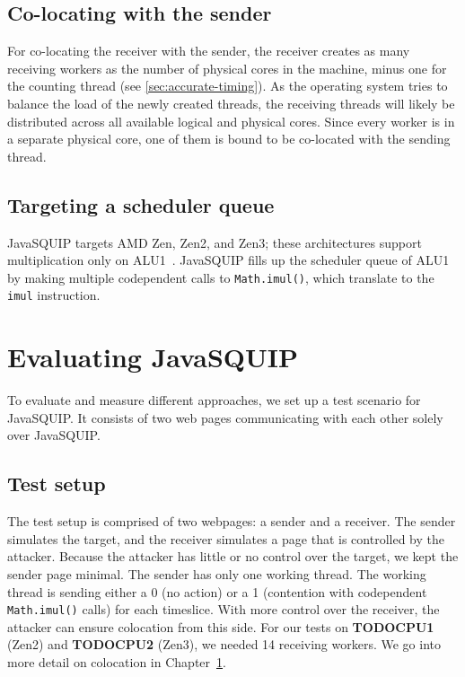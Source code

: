 \documentclass[11pt,
  titlepage=false,
]{scrreprt}
\begin{document}
\section{Co-locating with the sender}
\label{sec:colocation}
For co-locating the receiver with the sender, the receiver creates as many receiving workers as the number of physical cores in the machine, minus one for the counting thread (see \ref{sec:accurate-timing}).
As the operating system tries to balance the load of the newly created threads, the receiving threads will likely be distributed across all available logical and physical cores.
Since every worker is in a separate physical core, one of them is bound to be co-located with the sending thread.

\section{Targeting a scheduler queue}
JavaSQUIP targets AMD Zen, Zen2, and Zen3;
these architectures support multiplication only on ALU1~\cite{AMD2020OptimizationEPYC7003}.
JavaSQUIP fills up the scheduler queue of ALU1 by making multiple codependent calls to \texttt{Math.imul()}, which translate to the \texttt{imul} instruction.


\chapter{Evaluating JavaSQUIP}
\label{ch:evaluation}

To evaluate and measure different approaches, we set up a test scenario for JavaSQUIP.
It consists of two web pages communicating with each other solely over JavaSQUIP.

\section {Test setup}
The test setup is comprised of two webpages: a sender and a receiver.
The sender simulates the target, and the receiver simulates a page that is controlled by the attacker.
Because the attacker has little or no control over the target, we kept the sender page minimal.
The sender has only one working thread.
The working thread is sending either a 0 (no action) or a 1 (contention with codependent \texttt{Math.imul()} calls) for each timeslice.
With more control over the receiver, the attacker can ensure colocation from this side.
For our tests on \textbf{TODOCPU1} (Zen2) and \textbf{TODOCPU2} (Zen3), we needed 14 receiving workers.
We go into more detail on colocation in Chapter~\ref{sec:colocation}.
\end{document}
